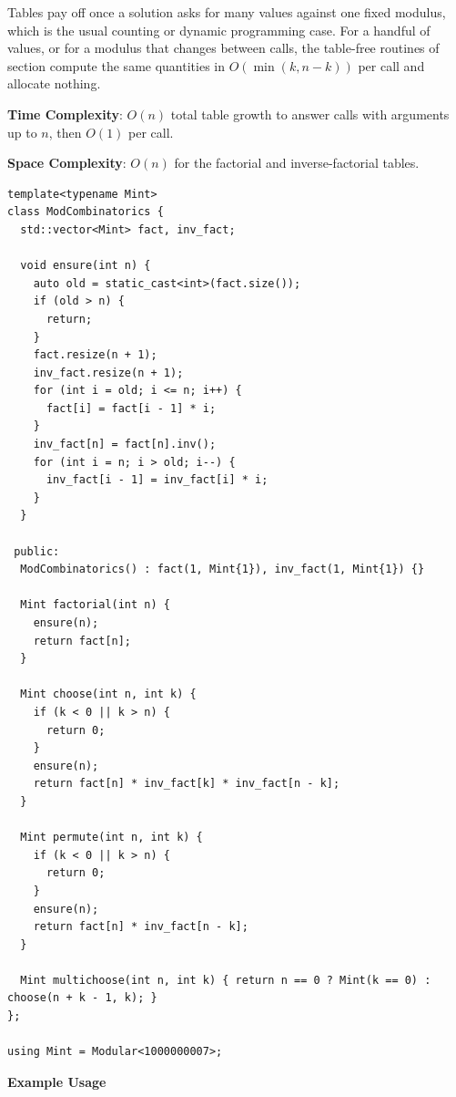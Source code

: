 Tables pay off once a solution asks for many values against one fixed modulus, which is the usual counting or dynamic programming case. For a handful of values, or for a modulus that changes between calls, the table-free routines of section  compute the same quantities in $O(\min\left(k, n - k\right))$ per call and allocate nothing.

\textbf{Time Complexity}: $O(n)$ total table growth to answer calls with arguments up to $n$, then $O(1)$ per call.

\textbf{Space Complexity}: $O(n)$ for the factorial and inverse-factorial tables.

\begin{lstlisting}[style=cpp]
template<typename Mint>
class ModCombinatorics {
  std::vector<Mint> fact, inv_fact;

  void ensure(int n) {
    auto old = static_cast<int>(fact.size());
    if (old > n) {
      return;
    }
    fact.resize(n + 1);
    inv_fact.resize(n + 1);
    for (int i = old; i <= n; i++) {
      fact[i] = fact[i - 1] * i;
    }
    inv_fact[n] = fact[n].inv();
    for (int i = n; i > old; i--) {
      inv_fact[i - 1] = inv_fact[i] * i;
    }
  }

 public:
  ModCombinatorics() : fact(1, Mint{1}), inv_fact(1, Mint{1}) {}

  Mint factorial(int n) {
    ensure(n);
    return fact[n];
  }

  Mint choose(int n, int k) {
    if (k < 0 || k > n) {
      return 0;
    }
    ensure(n);
    return fact[n] * inv_fact[k] * inv_fact[n - k];
  }

  Mint permute(int n, int k) {
    if (k < 0 || k > n) {
      return 0;
    }
    ensure(n);
    return fact[n] * inv_fact[n - k];
  }

  Mint multichoose(int n, int k) { return n == 0 ? Mint(k == 0) : choose(n + k - 1, k); }
};

using Mint = Modular<1000000007>;
\end{lstlisting}
\textbf{Example Usage}\par
